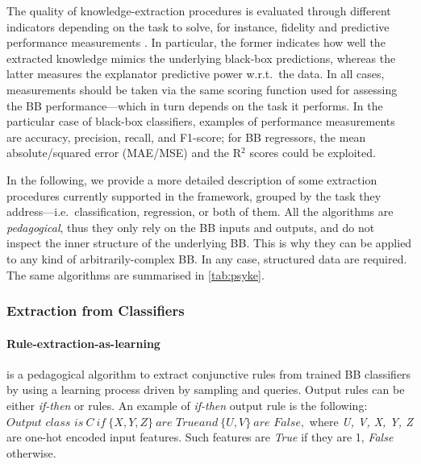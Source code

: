 \documentclass[12pt,a4paper,openright,twoside]{book}
\begin{document}
The quality of knowledge-extraction procedures is evaluated through different indicators depending on the task to solve, for instance, fidelity and predictive performance measurements \cite{towell1993extracting}.
%
In particular, the former indicates how well the extracted knowledge mimics the underlying black-box predictions, whereas the latter measures the explanator predictive power w.r.t.\ the data.
%
In all cases, measurements should be taken via the same scoring function used for assessing the BB performance---which in turn depends on the task it performs.
%
In the particular case of black-box classifiers, examples of performance measurements are accuracy, precision, recall, and F1-score; for BB regressors, the mean absolute/squared error (MAE/MSE) and the R${^2}$ scores could be exploited.

In the following, we provide a more detailed description of some extraction procedures currently supported in the \psyke{} framework, grouped by the task they address---i.e.\ classification, regression, or both of them.
%
All the algorithms are \emph{pedagogical}, thus they only rely on the BB inputs and outputs, and do not inspect the inner structure of the underlying BB.
%
This is why they can be applied to any kind of arbitrarily-complex BB.
%
In any case, structured data are required.
%
The same algorithms are summarised in \cref{tab:psyke}.



\subsubsection{Extraction from Classifiers}\label{ssec:classifiers}

\paragraph{Rule-extraction-as-learning}\label{par:real}

\real{} \cite{CravenS94} is a pedagogical algorithm to extract conjunctive rules from trained BB classifiers by using a learning process driven by sampling and queries.
%
Output rules can be either \emph{if-then} or \mofn{} rules.
%
An example of \emph{if-then} output rule is the following: $\textit{Output class is} ~ C ~ \textit{if} ~ \{ \mathit{X}, \mathit{Y}, \mathit{Z} \} \allowbreak ~ \textit{are True} \allowbreak \textit{and} ~  \{ \mathit{U}, \mathit{V} \} ~ \textit{are False},$
%
\noindent where \textit{U, V, X, Y, Z} are one-hot encoded input features.
%
Such features are \textit{True} if they are 1, \textit{False} otherwise.
\end{document}
